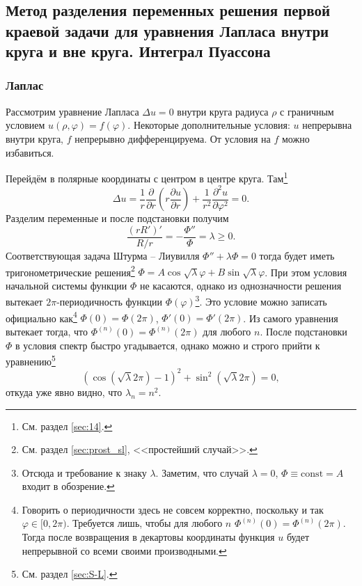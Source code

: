 \subsection{Метод разделения переменных решения первой краевой задачи для уравнения Лапласа внутри круга и вне круга. Интеграл Пуассона}
\subsubsection{Лаплас}
Рассмотрим уравнение Лапласа $ \Delta u = 0 $ внутри круга радиуса $ \rho $ с граничным условием
$ u(\rho, \varphi) = f(\varphi) $. Некоторые дополнительные условия: $ u $ непрерывна внутри круга, $ f
$ непрерывно дифференцируема. От условия на $ f $ можно избавиться.

Перейдём в полярные координаты с центром в центре круга. Там\footnote{См. раздел
\ref{sec:14}.}
\[
    \Delta u = \frac{1}{r} \frac{\partial}{\partial r}\left( r \frac{\partial
    u}{\partial r} \right) + \frac{1}{r^2}\frac{\partial^2 u}{\partial
  \varphi^2} = 0.
\]
Разделим переменные и после подстановки получим
\[
    \frac{(rR')'}{R/r} = - \frac{\Phi''}{\Phi} = \lambda \geqslant 0.
\]
Соответствующая задача Штурма -- Лиувилля $ \Phi'' + \lambda\Phi = 0 $
тогда будет иметь тригонометрические решения\footnote{См. раздел \ref{sec:prost_sl}, <<простейший
случай>>.} $ \Phi = A\cos\sqrt\lambda \varphi + B\sin\sqrt\lambda \varphi $.
При этом условия начальной системы функции $ \Phi $ не касаются, однако из
однозначности решения вытекает $ 2\pi $-периодичность функции $ \Phi(\varphi)
$\footnote{Отсюда и требование к знаку $ \lambda $. Заметим, что случай
$ \lambda = 0 $, $\Phi \equiv \mathrm{const} = A $ входит в обозрение.}.
Это условие можно записать официально как\footnote{Говорить о периодичности
  здесь не совсем корректно, поскольку и так $ \varphi \in [0, 2\pi) $.
Требуется лишь, чтобы для любого $ n $ $ \Phi^{(n)}(0) = \Phi^{(n)}(2\pi) $.
Тогда после возвращения в декартовы координаты функция $ u $ будет непрерывной
со всеми своими производными.} $ \Phi(0) = \Phi(2\pi) $, $ \Phi'(0) =
\Phi'(2\pi) $. Из самого уравнения вытекает тогда, что $ \Phi^{(n)}(0) =
\Phi^{(n)}(2\pi) $ для любого $ n $. После подстановки $ \Phi $ в условия спектр
быстро угадывается, однако можно и строго прийти к уравнению\footnote{См. раздел
\ref{sec:S-L}.} 
\[
  \left(\cos ( \sqrt\lambda 2\pi ) - 1\right)^2 + \sin^2 \left(\sqrt\lambda2\pi\right)=0,
\]
откуда уже явно видно, что $ \lambda_n = n^2 $.

